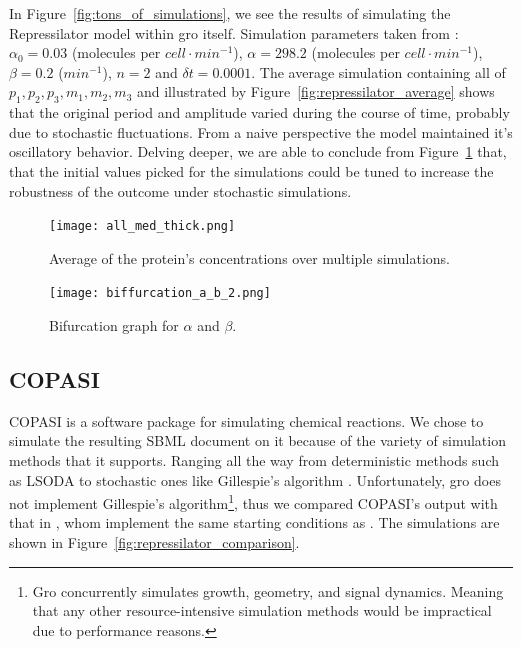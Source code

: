 \documentclass[12pt]{article}
\begin{document}
   In Figure~\ref{fig:tons_of_simulations}, we see the results of simulating the Repressilator model within gro itself. Simulation parameters taken from \cite{ingalls2013mathematical}: $\alpha_{0} = 0.03$ (molecules per $cell \cdot min^{-1}$), $\alpha = 298.2$ (molecules per $cell \cdot min^{-1}$), $\beta = 0.2$ ($min^{-1}$), $n = 2$ and $\delta t = 0.0001$. The average simulation containing all of $p_{1}, p_{2}, p_{3}, m_{1}, m_{2}, m_{3}$ and illustrated by Figure~\ref{fig:repressilator_average} shows that the original period and amplitude varied during the course of time, probably due to stochastic fluctuations. From a naive perspective the model maintained it's oscillatory behavior. Delving deeper, we are able to conclude from Figure~\ref{fig:biffurcation} that, that the initial values picked for the simulations could be tuned to increase the robustness of the outcome under stochastic simulations.

    \begin{figure}[ht]
    \centering
      \texttt{[image: all\_med\_thick.png]}
      \caption{Average of the protein's concentrations over multiple simulations.}
      \label{fig:repressilator_average}
    \endminipage\hfill
      \texttt{[image: biffurcation\_a\_b\_2.png]}
      \caption{Bifurcation graph for $\alpha$ and $\beta$.}
      \label{fig:biffurcation}
    \endminipage\hfill
    \end{figure}

\subsection{COPASI}
    
    COPASI is a software package for simulating chemical reactions. We chose to simulate the resulting SBML document on it because of the variety of simulation methods that it supports. Ranging all the way from deterministic methods such as LSODA \cite{Petzold1983} to stochastic ones like Gillespie’s algorithm \cite{Gillespie1976}. Unfortunately, gro does not implement Gillespie’s algorithm\footnote{Gro concurrently simulates growth, geometry, and signal dynamics. Meaning that any other resource-intensive simulation methods would be impractical due to performance reasons.}, thus we compared COPASI's output with that in \cite{Goeldner2019}, whom implement the same starting conditions as \cite{ingalls2013mathematical}. The simulations are shown in Figure~\ref{fig:repressilator_comparison}.
    
\end{document}
